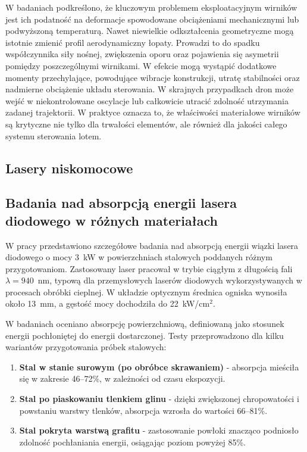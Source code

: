 \documentclass[a4paper,twoside,12pt]{book}
\begin{document}
W badaniach podkreślono, że kluczowym problemem eksploatacyjnym wirników jest ich podatność na deformacje spowodowane obciążeniami mechanicznymi lub podwyższoną temperaturą. Nawet niewielkie odkształcenia geometryczne mogą istotnie zmienić profil aerodynamiczny łopaty. Prowadzi to do spadku współczynnika siły nośnej, zwiększenia oporu oraz pojawienia się asymetrii pomiędzy poszczególnymi wirnikami. W efekcie mogą wystąpić dodatkowe momenty przechylające, powodujące wibracje konstrukcji, utratę stabilności oraz nadmierne obciążenie układu sterowania. W skrajnych przypadkach dron może wejść w niekontrolowane oscylacje lub całkowicie utracić zdolność utrzymania zadanej trajektorii. W praktyce oznacza to, że właściwości materiałowe wirników są krytyczne nie tylko dla trwałości elementów, ale również dla jakości całego systemu sterowania lotem.


\subsection{Lasery niskomocowe}


\subsection*{Badania nad absorpcją energii lasera diodowego w różnych materiałach}

W pracy \cite{bib:pantsar2004} przedstawiono szczegółowe badania nad absorpcją energii wiązki lasera diodowego o mocy 3~kW w powierzchniach stalowych poddanych różnym przygotowaniom. Zastosowany laser pracował w trybie ciągłym z długością fali $\lambda = 940$~nm, typową dla przemysłowych laserów diodowych wykorzystywanych w procesach obróbki cieplnej. W układzie optycznym średnica ogniska wynosiła około 13~mm, a gęstość mocy dochodziła do 22~kW/cm$^2$.

W badaniach oceniano absorpcję powierzchniową, definiowaną jako stosunek energii pochłoniętej do energii dostarczonej. Testy przeprowadzono dla kilku wariantów przygotowania próbek stalowych:
\begin{enumerate}
    \item \textbf{Stal w stanie surowym (po obróbce skrawaniem)} - absorpcja mieściła się w zakresie 46--72\%, w zależności od czasu ekspozycji.
    \item \textbf{Stal po piaskowaniu tlenkiem glinu} - dzięki zwiększonej chropowatości i powstaniu warstwy tlenków, absorpcja wzrosła do wartości 66--81\%.
    \item \textbf{Stal pokryta warstwą grafitu} - zastosowanie powłoki znacząco podniosło zdolność pochłaniania energii, osiągając poziom powyżej 85\%.
\end{enumerate}
\end{document}
